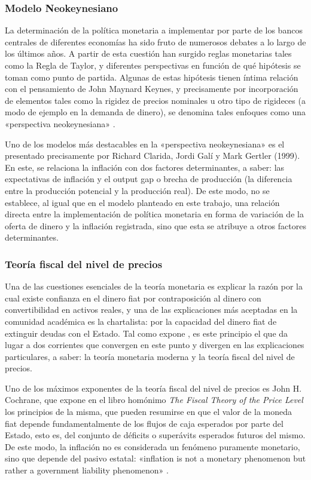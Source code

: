 \documentclass[titlepage, 12pt]{article}
\begin{document}
\subsubsection{Modelo Neokeynesiano}\label{modelo-neokeynesiano}
La determinación de la política monetaria a implementar por parte de los bancos centrales de diferentes economías ha sido fruto de numerosos debates a lo largo de los últimos años. A partir de esta cuestión han surgido reglas monetarias tales como la Regla de Taylor, y diferentes perspectivas en función de qué hipótesis se toman como punto de partida. Algunas de estas hipótesis tienen íntima relación con el pensamiento de John Maynard Keynes, y precisamente por incorporación de elementos tales como la rigidez de precios nominales u otro tipo de rigideces (a modo de ejemplo en la demanda de dinero), se denomina tales enfoques como una «perspectiva neokeynesiana» \autocite[1662]{clarida1999}.

Uno de los modelos más destacables en la «perspectiva neokeynesiana» es el presentado precisamente por Richard Clarida, Jordi Galí y Mark Gertler (1999). En este, se relaciona la inflación con dos factores determinantes, a saber: las expectativas de inflación y el output gap o brecha de producción (la diferencia entre la producción potencial y la producción real). De este modo, no se establece, al igual que en el modelo planteado en este trabajo, una relación directa entre la implementación de política monetaria en forma de variación de la oferta de dinero y la inflación registrada, sino que esta se atribuye a otros factores determinantes.

\subsubsection{Teoría fiscal del nivel de precios}
Una de las cuestiones esenciales de la teoría monetaria es explicar la razón por la cual existe confianza en el dinero fiat por contraposición al dinero con convertibilidad en activos reales, y una de las explicaciones más aceptadas en la comunidad académica es la chartalista: por la capacidad del dinero fiat de extinguir deudas con el Estado. Tal como expone \cite{ben_gad2023}, es este principio el que da lugar a dos corrientes que convergen en este punto y divergen en las explicaciones particulares, a saber: la teoría monetaria moderna y la teoría fiscal del nivel de precios.

Uno de los máximos exponentes de la teoría fiscal del nivel de precios es John H. Cochrane, que expone en el libro homónimo \textit{The Fiscal Theory of the Price Level} \autocite*{cochrane2023} los principios de la misma, que pueden resumirse en que el valor de la moneda fiat depende fundamentalmente de los flujos de caja esperados por parte del Estado, esto es, del conjunto de déficits o superávits esperados futuros del mismo. De este modo, la inflación no es considerada un fenómeno puramente monetario, sino que depende del pasivo estatal: «inflation is not a monetary phenomenon but rather a government liability phenomenon» \autocite[305]{ben_gad2023}.
\end{document}
